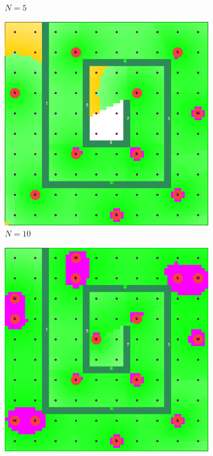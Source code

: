 \documentclass[conference]{IEEEtran}
\begin{document}
\begin{figure}[t]
\begin{subfigure}[t]{0.10\textwidth}
        \caption{$N=5$}
    \end{subfigure}\hfill
    \begin{subfigure}[t]{0.10\textwidth}
        \centering
        \includegraphics[width=\textwidth]{Figures/Maze1_2.png}
        \caption{$N=10$}
    \end{subfigure}\hfill
    \begin{subfigure}[t]{0.10\textwidth}
        \centering
        \includegraphics[width=\textwidth]{Figures/Maze1_3.png}

\end{subfigure}
\end{figure}
\end{document}
